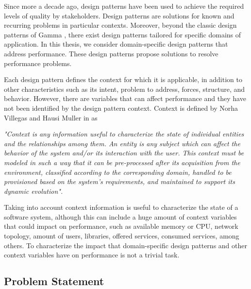 Since more a decade ago, design patterns have been used to achieve the required levels of quality by stakeholders. Design patterns are solutions for known and recurring problems in particular contexts. Moreover, beyond the classic design patterns of Gamma \etal{} \cite{Gamma:1995:DesignPatternsBook}, there exist design patterns tailored for specific domains of application. In this thesis, we consider domain-specific design patterns that address performance. These design patterns propose solutions to resolve performance problems.

Each design pattern defines the context for which it is applicable, in addition to other characteristics such as its intent, problem to address, forces, structure, and behavior. However, there are variables that can affect performance and they have not been identified by the design pattern context. Context is defined by Norha Villegas and Hausi Muller in \cite{villegas2010managing} as 

\textit{"Context is any information useful to characterize the state of individual entities and the relationships among them. An entity is any subject which can affect the behavior of the system and/or its interaction with the user. This context must be modeled in such a way that it can be pre-processed after its acquisition from the environment, classified according to the corresponding domain, handled to be provisioned based on the system’s requirements, and maintained to support its dynamic evolution".} 

Taking into account context information is useful to characterize the state of a software system, although this can include a huge amount of context variables that could impact on performance, such as available memory or CPU, network topology, amount of users, libraries, offered services, consumed services, among others. To characterize the impact that domain-specific design patterns and other context variables have on performance is not a trivial task. 


\subsection{Problem Statement}
\label{sec:ProblemStatement}

